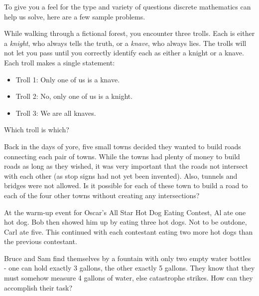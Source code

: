 \documentclass[11pt]{exam}
\begin{document}
To give you a feel for the type and variety of questions discrete mathematics can help us solve, here are a few sample problems.
\begin{questions}


  \question While walking through a fictional forest, you encounter three trolls.  Each is either a {\em knight}, who always tells the truth, or a {\em knave}, who always lies.  The trolls will not let you pass until you correctly identify each as either a knight or a knave.  Each troll makes a single statement:
  \begin{itemize}
   \item[] Troll 1: Only one of us is a knave.
   \item[] Troll 2: No, only one of us is a knight.
   \item[] Troll 3: We are all knaves.
  \end{itemize}
  Which troll is which?
  
  \question Back in the days of yore, five small towns decided they wanted to build roads connecting each pair of towns. While the towns had plenty of money to build roads as long as they wished, it was very important that the roads not intersect with each other (as stop signs had not yet been invented). Also, tunnels and bridges were not allowed. Is it possible for each of these town to build a road to each of the four other towns without creating any intersections? 
  
  
  
  \question At the warm-up event for Oscar's All Star Hot Dog Eating Contest, Al ate one hot dog.  Bob then showed him up by eating three hot dogs.  Not to be outdone, Carl ate five.  This continued with each contestant eating two more hot dogs than the previous contestant.

  
  \question Bruce and Sam find themselves by a fountain with only two empty water bottles - one can hold exactly 3 gallons, the other exactly 5 gallons.  They know that they must somehow measure 4 gallons of water, else catastrophe strikes.  How can they accomplish their task?

\end{questions}
\end{document}
